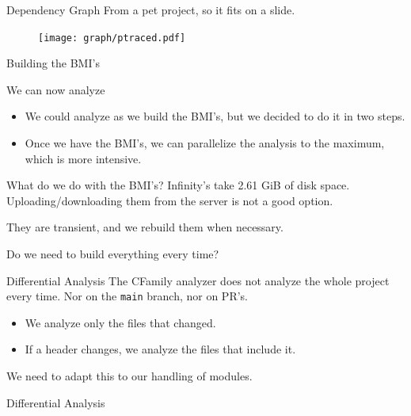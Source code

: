 \documentclass[]{beamer}
\begin{document}
\begin{frame}{Dependency Graph}
  \small From a pet project, so it fits on a slide.
  \begin{figure}
    \texttt{[image: graph/ptraced.pdf]}
  \end{figure}
\end{frame}

\begin{frame}{Building the BMI's}
\end{frame}

\begin{frame}{We can now analyze}
  \begin{itemize}
    \item We could analyze as we build the BMI's, but we decided to do it in two steps.
    \item Once we have the BMI's, we can parallelize the analysis to the maximum, which is more intensive.
  \end{itemize}
  \begin{block}{What do we do with the BMI's?}
    Infinity's take 2.61 GiB of disk space. Uploading/downloading them from the server is not a good option.

    They are transient, and we rebuild them when necessary.
  \end{block}
\end{frame}

\begin{frame}{Do we need to build everything every time?}
  \begin{block}{Differential Analysis}
    The CFamily analyzer does not analyze the whole project every time.
    Nor on the \texttt{main} branch, nor on PR's.
    \begin{itemize}
      \item We analyze only the files that changed.
      \item If a header changes, we analyze the files that include it.
    \end{itemize}
    We need to adapt this to our handling of modules.
  \end{block}
\end{frame}

\begin{frame}{Differential Analysis}
\end{frame}
\end{document}
